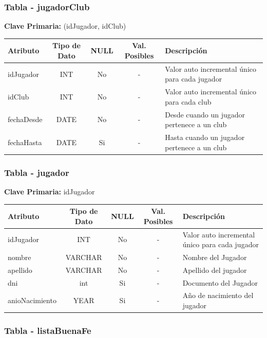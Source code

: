 \subsubsection{Tabla - jugadorClub}

\textbf{Clave Primaria: } (idJugador, idClub)

\begin{table}[H]
	\centering
	\begin{tabularx}{\textwidth}{|l|c|c|c|X|} \hline
		\textbf{Atributo} & \textbf{Tipo de Dato} & \textbf{NULL} & \textbf{Val. Posibles} & \textbf{Descripción} \\ \hline
		idJugador & INT & No & - & Valor auto incremental único para cada jugador \\ \hline
		idClub & INT & No & - & Valor auto incremental único para cada club \\ \hline
		fechaDesde & DATE & No & - & Desde cuando un jugador pertenece a un club \\ \hline
		fechaHasta & DATE & Si & - & Hasta cuando un jugador pertenece a un club \\ \hline
	\end{tabularx}
\end{table}

\subsubsection{Tabla - jugador}

\textbf{Clave Primaria: } idJugador

\begin{table}[H]
	\centering
	\begin{tabularx}{\textwidth}{|l|c|c|c|X|} \hline
		\textbf{Atributo} & \textbf{Tipo de Dato} & \textbf{NULL} & \textbf{Val. Posibles} & \textbf{Descripción} \\ \hline
		idJugador & INT & No & - & Valor auto incremental único para cada jugador \\ \hline
		nombre & VARCHAR & No & - & Nombre del Jugador \\ \hline
		apellido & VARCHAR & No & - & Apellido del jugador\\ \hline
		dni & int & Si & - & Documento del Jugador \\ \hline
		anioNacimiento & YEAR & Si & - & Año de nacimiento del jugador \\ \hline
	\end{tabularx}
\end{table}

\subsubsection{Tabla - listaBuenaFe}

